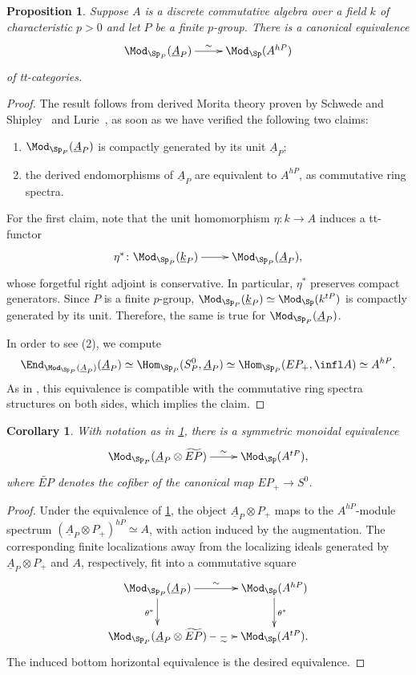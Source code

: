 \documentclass{amsart}%
\numberwithin{equation}{section}%
\newtheorem{Prop}[subsection]{Proposition}
\newtheorem{Cor}[subsection]{Corollary}
\theoremstyle{remark}
\newcounter{enum-resume-hack}
\begin{document}
\begin{Prop}\label{prop:monogenicborel}
Suppose $A$ is a discrete commutative algebra over a field $k$ of characteristic $p>0$ and let $P$ be a finite $p$-group. There is a canonical equivalence
\[
\xymatrix{\Mod_{\Sp_P}(\underline{A}_P) \ar[r]^-{\sim} & \Mod_{\Sp}(A^{hP})}
\]
of tt-categories. 
\end{Prop}
\begin{proof}
The result follows from derived Morita theory proven by Schwede and Shipley~\cite{SS03} and Lurie~\cite[Thm.~7.1.2.1]{HALurie}, as soon as we have verified the following two claims:
    \begin{enumerate}
        \item $\Mod_{\Sp_P}(\underline{A}_P)$ is compactly generated by its unit $\underline{A}_P$;
        \item the derived endomorphisms of $\underline{A}_P$ are equivalent to $A^{hP}$, as commutative ring spectra. 
    \end{enumerate}
For the first claim, note that the unit homomorphism $\eta\colon k \to A$ induces a tt-functor
\[
\xymatrix{\eta^*\colon \Mod_{\Sp_P}(\underline{k}_P) \ar[r] & \Mod_{\Sp_P}(\underline{A}_P),}
\]
whose forgetful right adjoint is conservative. In particular, $\eta^*$ preserves compact generators. Since $P$ is a finite $p$-group, $\Mod_{\Sp_P}(\underline{k}_P) \simeq \Mod_{\Sp}(k^{tP})$ is compactly generated by its unit. Therefore, the same is true for $\Mod_{\Sp_P}(\underline{A}_P)$.

In order to see (2), we compute
\[
\End_{\Mod_{\Sp_P}(\underline{A}_P)}(\underline{A}_P) \simeq \Hom_{\Sp_P}(S_P^0,\underline{A}_P) \simeq \Hom_{\Sp_P}(EP_+,\infl A) \simeq A^{hP}.
\]
As in \cite[\S2.2]{mathew_torus}, this equivalence is compatible with the commutative ring spectra structures on both sides, which implies the claim.
\end{proof}

\begin{Cor}\label{cor:monogenicgentate}
With notation as in \cref{prop:monogenicborel}, there is a symmetric monoidal equivalence
\[
\xymatrix{\Mod_{\Sp_P}(\underline{A}_P \otimes \widetilde{EP}) \ar[r]^-{\sim} & \Mod_{\Sp}(A^{tP}),}
\]
where $\widetilde{EP}$ denotes the cofiber of the canonical map $EP_+ \to S^0$.
\end{Cor}
\begin{proof}
Under the equivalence of \cref{prop:monogenicborel}, the object $\underline{A}_P \otimes P_+$ maps to the $A^{hP}$-module spectrum $(\underline{A}_P\otimes P_+)^{hP} \simeq A$, with action induced by the augmentation. The corresponding finite localizations away from the localizing ideals generated by $\underline{A}_P \otimes P_+$ and $A$, respectively, fit into a commutative square
\[
\xymatrix{\Mod_{\Sp_P}(\underline{A}_P) \ar[r]^-{\sim} \ar[d]_{\theta^*} & \Mod_{\Sp}(A^{hP}) \ar[d]^{\theta^*} \\
\Mod_{\Sp_P}(\underline{A}_P \otimes \widetilde{EP}) \ar@{-->}[r]_-{\sim} & \Mod_{\Sp}(A^{tP}).}
\]
The induced bottom horizontal equivalence is the desired equivalence.
\end{proof}
\end{document}
